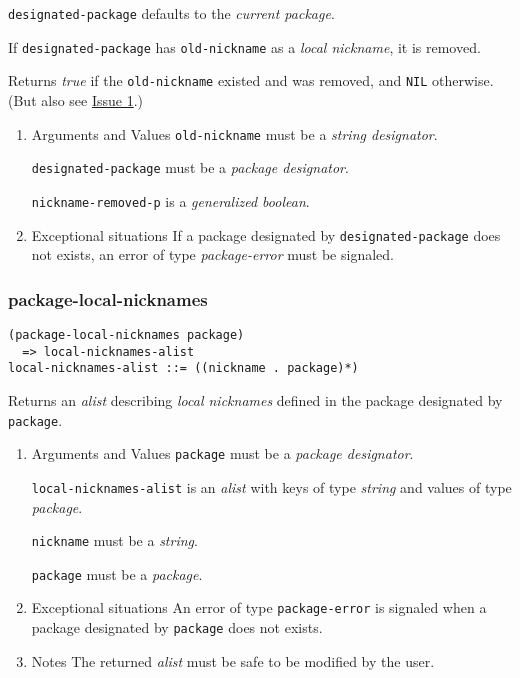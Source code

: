 \documentclass[11pt]{article}
\begin{document}
\texttt{designated-package} defaults to the \emph{current package}.

If \texttt{designated-package} has \texttt{old-nickname} as a \emph{local nickname}, it is removed.

Returns \emph{true} if the \texttt{old-nickname} existed and was removed, and \texttt{NIL}
otherwise. (But also see \hyperref[sec:orgb9483d0]{Issue 1}.)
\begin{enumerate}
\item Arguments and Values
\label{sec:orgf7a127b}
\texttt{old-nickname} must be a \emph{string designator}.

\texttt{designated-package} must be a \emph{package designator}.

\texttt{nickname-removed-p} is a \emph{generalized boolean}.
\item Exceptional situations
\label{sec:org2966c17}
If a package designated by \texttt{designated-package} does not exists, an error of type
\emph{package-error} must be signaled.
\end{enumerate}
\subsubsection{package-local-nicknames}
\label{sec:org27445ea}
\begin{verbatim}
(package-local-nicknames package)
  => local-nicknames-alist
local-nicknames-alist ::= ((nickname . package)*)
\end{verbatim}

Returns an \emph{alist} describing \emph{local nicknames} defined in the package designated
by \texttt{package}.
\begin{enumerate}
\item Arguments and Values
\label{sec:org0bf9d07}
\texttt{package} must be a \emph{package designator}.

\texttt{local-nicknames-alist} is an \emph{alist} with keys of type \emph{string} and values of
type \emph{package}.

\texttt{nickname} must be a \emph{string}.

\texttt{package} must be a \emph{package}.
\item Exceptional situations
\label{sec:org355daed}
An error of type \texttt{package-error} is signaled when a package designated by
\texttt{package} does not exists.
\item Notes
\label{sec:org1b1db7a}
The returned \emph{alist} must be safe to be modified by the user.
\end{enumerate}
\end{document}
